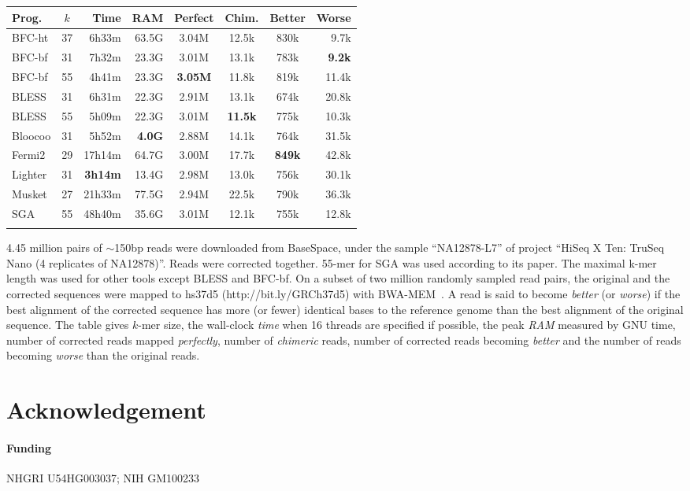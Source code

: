 \documentclass{bioinfo}
\begin{document}
\begin{table}[ht]
{\footnotesize
\begin{tabular}{lcrrcccr}
\toprule
Prog.     & $k$ & Time  & RAM   & Perfect&Chim.& Better & Worse \\
\midrule
BFC-ht    & 37  & 6h33m & 63.5G & 3.04M  & 12.5k  & 830k   & 9.7k \\
BFC-bf    & 31  & 7h32m & 23.3G & 3.01M  & 13.1k  & 783k   &{\bf 9.2k}\\
BFC-bf    & 55  & 4h41m & 23.3G&{\bf 3.05M}&11.8k & 819k   & 11.4k \\
BLESS     & 31  & 6h31m & 22.3G & 2.91M  & 13.1k  & 674k   & 20.8k \\
BLESS     & 55  & 5h09m & 22.3G & 3.01M  &{\bf 11.5k}& 775k& 10.3k \\
Bloocoo   & 31  & 5h52m &{\bf 4.0G}&2.88M& 14.1k  & 764k   & 31.5k  \\
Fermi2    & 29  &17h14m & 64.7G & 3.00M  & 17.7k  &{\bf 849k}&42.8k \\
Lighter   & 31  &{\bf 3h14m}& 13.4G&2.98M& 13.0k  & 756k   & 30.1k  \\
Musket    & 27  &21h33m & 77.5G & 2.94M  & 22.5k  & 790k   & 36.3k  \\
SGA       & 55  &48h40m & 35.6G & 3.01M  & 12.1k  & 755k   & 12.8k  \\
\botrule
\end{tabular}}{4.45 million pairs of $\sim$150bp reads were
downloaded from BaseSpace, under the sample ``NA12878-L7'' of project
``HiSeq X Ten: TruSeq Nano (4 replicates of NA12878)''. Reads were corrected
together. 55-mer for SGA was used according to its paper. The maximal k-mer
length was used for other tools except BLESS and BFC-bf. On a subset of two
million randomly sampled read pairs, the original and the corrected sequences
were mapped to hs37d5 (http://bit.ly/GRCh37d5) with BWA-MEM~\citep{Li:2013aa}.
A read is said to become \emph{better} (or \emph{worse}) if the best alignment
of the corrected sequence has more (or fewer) identical bases to the reference
genome than the best alignment of the original sequence. The table gives
$k$-mer size, the wall-clock \emph{time} when 16 threads are specified if
possible, the peak \emph{RAM} measured by GNU time, number of corrected reads
mapped \emph{perfectly}, number of \emph{chimeric} reads, number of corrected
reads becoming \emph{better} and the number of reads becoming \emph{worse} than
the original reads.}

\end{table}

\section*{Acknowledgement}
\paragraph{Funding\textcolon} NHGRI U54HG003037; NIH GM100233


\end{document}
